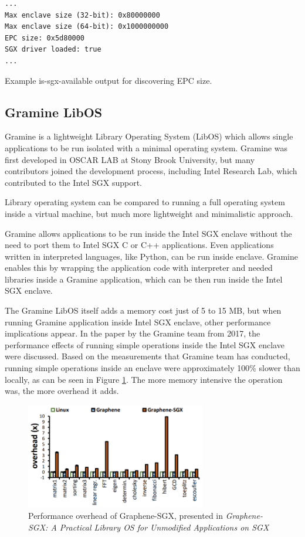 \begin{algorithm}
\begin{verbatim}
...
Max enclave size (32-bit): 0x80000000
Max enclave size (64-bit): 0x1000000000
EPC size: 0x5d80000
SGX driver loaded: true
...
\end{verbatim}
\caption{Example is-sgx-available output for discovering EPC size.\label{alg:issgx}}
\end{algorithm}

\subsection{Gramine LibOS}\label{gramine}

Gramine is a lightweight Library Operating System (LibOS) which allows single applications to be run isolated with a minimal operating system. Gramine was first developed in OSCAR LAB at Stony Brook University, but many contributors joined the development process, including Intel Research Lab, which contributed to the Intel SGX support. 

Library operating system can be compared to running a full operating system inside a virtual machine, but much more lightweight and minimalistic approach.

Gramine allows applications to be run inside the Intel SGX enclave without the need to port them to Intel SGX C or C++ applications. Even applications written in interpreted languages, like Python, can be run inside enclave. Gramine enables this by wrapping the application code with interpreter and needed libraries inside a Gramine application, which can be then run inside the Intel SGX enclave.\cite{graminedocs}

The Gramine LibOS itself adds a memory cost just of 5 to 15 MB, but when running Gramine application inside Intel SGX enclave, other performance implications appear. In the paper\cite{graminesgxwp} by the Gramine team from 2017, the performance effects of running simple operations inside the Intel SGX enclave were discussed. Based on the measurements that Gramine team has conducted, running simple operations inside an enclave were approximately 100\% slower than locally, as can be seen in Figure \ref{img:graminebenchmark}. The more memory intensive the operation was, the more overhead it adds.

\begin{figure}
\centering \includegraphics[width=0.7\textwidth]{img/graminebenchmark}
\caption{Performance overhead of Graphene-SGX, presented in \textit{Graphene-SGX: A Practical Library {OS} for Unmodified Applications on SGX}}
\label{img:graminebenchmark} 
\end{figure}

